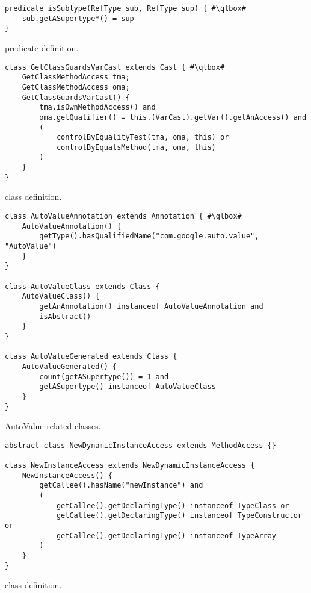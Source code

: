 \begin{listing}
\begin{verbatim}
predicate isSubtype(RefType sub, RefType sup) { #\qlbox#
	sub.getASupertype*() = sup
}
\end{verbatim}
\caption{ predicate definition.}
\label{lst:ql:isSubtype}
\end{listing}


\begin{listing}
\begin{verbatim}	
class GetClassGuardsVarCast extends Cast { #\qlbox#
	GetClassMethodAccess tma;
	GetClassMethodAccess oma;
	GetClassGuardsVarCast() {
		tma.isOwnMethodAccess() and
		oma.getQualifier() = this.(VarCast).getVar().getAnAccess() and
		(
			controlByEqualityTest(tma, oma, this) or
			controlByEqualsMethod(tma, oma, this)
		)
	}
}
\end{verbatim}
\caption{ class definition.}
\label{lst:ql:GetClassGuardsVarCast}
\end{listing}


\begin{listing}
\begin{verbatim}	
class AutoValueAnnotation extends Annotation { #\qlbox#
	AutoValueAnnotation() {
		getType().hasQualifiedName("com.google.auto.value", "AutoValue")
	}
}

class AutoValueClass extends Class {
	AutoValueClass() {
		getAnAnnotation() instanceof AutoValueAnnotation and
		isAbstract()
	}
}

class AutoValueGenerated extends Class {
	AutoValueGenerated() {
		count(getASupertype()) = 1 and
		getASupertype() instanceof AutoValueClass
	}
}
\end{verbatim}
\caption{AutoValue related \ql{} classes.}
\label{lst:ql:AutoValueGenerated}
\end{listing}


\begin{listing}
\begin{verbatim}
abstract class NewDynamicInstanceAccess extends MethodAccess {}

class NewInstanceAccess extends NewDynamicInstanceAccess {
	NewInstanceAccess() {
		getCallee().hasName("newInstance") and
		(
			getCallee().getDeclaringType() instanceof TypeClass or
			getCallee().getDeclaringType() instanceof TypeConstructor or
			getCallee().getDeclaringType() instanceof TypeArray
		)
	}
}
\end{verbatim}
\caption{ class definition.}
\label{lst:ql:NewDynamicInstanceAccess}
\end{listing}

